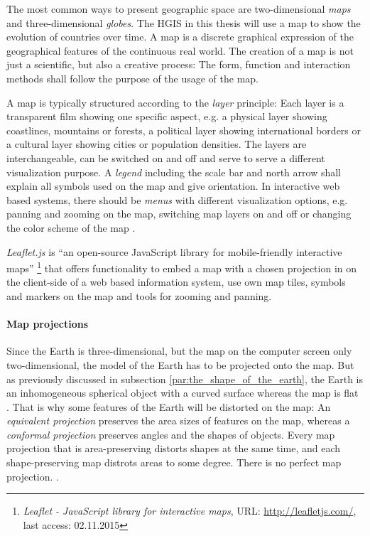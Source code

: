 The most common ways to present geographic space are two-dimensional \emph{maps} and three-dimensional \emph{globes}. The HGIS in this thesis will use a map to show the evolution of countries over time. A map is a discrete graphical expression of the geographical features of the continuous real world. The creation of a map is not just a scientific, but also a creative process: The form, function and interaction methods shall follow the purpose of the usage of the map.

A map is typically structured according to the \emph{layer} principle: Each layer is a transparent film showing one specific aspect, e.g. a physical layer showing coastlines, mountains or forests, a political layer showing international borders or a cultural layer showing cities or population densities. The layers are interchangeable, can be switched on and off and serve to serve a different visualization purpose. A \emph{legend} including the scale bar and north arrow shall explain all symbols used on the map and give orientation. In interactive web based systems, there should be \emph{menus} with different visualization options, e.g. panning and zooming on the map, switching map layers on and off or changing the color scheme of the map
\cite[pp. 159-166]{bolstad2008gis}.

\emph{Leaflet.js} is ``an open-source JavaScript library for mobile-friendly interactive maps''
\footnote{
  \textit{Leaflet - JavaScript library for interactive maps},
  URL: \url{http://leafletjs.com/},
  last access: 02.11.2015
}
that offers functionality to embed a map with a chosen projection in on the client-side of a web based information system, use own map tiles, symbols and markers on the map and tools for zooming and panning.

\paragraph{Map projections} %
\label{par:map_projections}

Since the Earth is three-dimensional, but the map on the computer screen only two-dimensional, the model of the Earth has to be projected onto the map. But as previously discussed in subsection \ref{par:the_shape_of_the_earth}, the Earth is an inhomogeneous spherical object with a curved surface whereas the map is flat
\cite[p.79]{bolstad2008gis}.
That is why some features of the Earth will be distorted on the map: An \emph{equivalent projection} preserves the area sizes of features on the map, whereas a \emph{conformal projection} preserves angles and the shapes of objects. Every map projection that is area-preserving distorts shapes at the same time, and each shape-preserving map distrots areas to some degree. There is no perfect map projection.
\cite{mapProjectionGeokov}.

